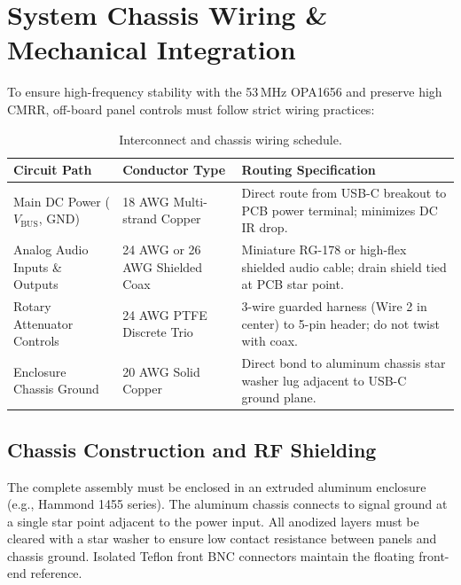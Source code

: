\documentclass[11pt, letterpaper]{article}
\begin{document}
\section{System Chassis Wiring \& Mechanical Integration}

To ensure high-frequency stability with the 53\,MHz OPA1656 and preserve high CMRR, off-board panel controls must follow strict wiring practices:

\begin{table}[H]
    \centering
    \small
    \setlength{\tabcolsep}{4pt}
    \begin{tabularx}{\linewidth}{@{} l l L @{}}
        \toprule
        \textbf{Circuit Path} & \textbf{Conductor Type} & \textbf{Routing Specification} \\
        \midrule
        Main DC Power ($V_{\text{BUS}}$, GND) & 18 AWG Multi-strand Copper & Direct route from USB-C breakout to PCB power terminal; minimizes DC IR drop. \\
        Analog Audio Inputs \& Outputs & 24 AWG or 26 AWG Shielded Coax & Miniature RG-178 or high-flex shielded audio cable; drain shield tied at PCB star point. \\
        Rotary Attenuator Controls & 24 AWG PTFE Discrete Trio & 3-wire guarded harness (Wire 2 in center) to 5-pin header; do not twist with coax. \\
        Enclosure Chassis Ground & 20 AWG Solid Copper & Direct bond to aluminum chassis star washer lug adjacent to USB-C ground plane. \\
        \bottomrule
    \end{tabularx}
    \caption{Interconnect and chassis wiring schedule.}
    \label{tab:wiring}
\end{table}

\subsection{Chassis Construction and RF Shielding}
The complete assembly must be enclosed in an extruded aluminum enclosure (e.g., Hammond 1455 series). The aluminum chassis connects to signal ground at a single star point adjacent to the power input. All anodized layers must be cleared with a star washer to ensure low contact resistance between panels and chassis ground. Isolated Teflon front BNC connectors maintain the floating front-end reference.
\end{document}

